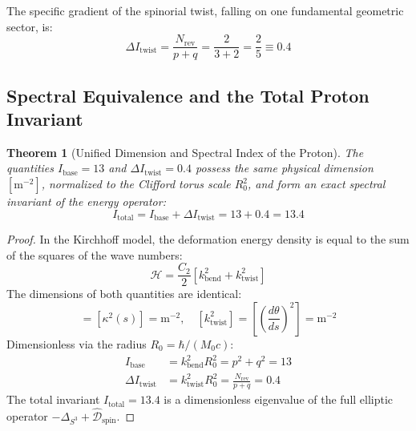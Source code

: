 \documentclass[12pt,a4paper]{article}
\newtheorem{theorem}{Theorem}
\begin{document}
	The specific gradient of the spinorial twist, falling on one fundamental geometric sector, is:
	\begin{equation}
		\Delta I_{\text{twist}} = \frac{N_{\text{rev}}}{p + q} = \frac{2}{3 + 2} = \frac{2}{5} \equiv \mathbf{0.4}
	\end{equation}
	
	\subsection{Spectral Equivalence and the Total Proton Invariant}
	\begin{theorem}[Unified Dimension and Spectral Index of the Proton]
		The quantities $I_{\mathrm{base}} = 13$ and $\Delta I_{\mathrm{twist}} = 0.4$ possess the same physical dimension $[\mathrm{m}^{-2}]$, normalized to the Clifford torus scale $R_0^2$, and form an exact spectral invariant of the energy operator:
		\begin{equation}
			I_{\mathrm{total}} = I_{\mathrm{base}} + \Delta I_{\mathrm{twist}} = 13 + 0.4 = \mathbf{13.4}
		\end{equation}
	\end{theorem}
	
	\begin{proof}
		In the Kirchhoff model, the deformation energy density is equal to the sum of the squares of the wave numbers:
		\begin{equation}
			\mathcal{H} = \frac{C_2}{2} \left[ k_{\text{bend}}^2 + k_{\text{twist}}^2 \right]
		\end{equation}
		The dimensions of both quantities are identical:
		\begin{equation}
			[k_{\text{bend}}^2] = [\kappa^2(s)] = \text{m}^{-2}, \quad [k_{\text{twist}}^2] = \left[\left(\frac{d\theta}{ds}\right)^2\right] = \text{m}^{-2}
		\end{equation}
		Dimensionless via the radius $R_0 = \hbar / (M_0 c)$:
		\begin{align}
			I_{\text{base}} &= k_{\text{bend}}^2 R_0^2 = p^2 + q^2 = 13 \\
			\Delta I_{\text{twist}} &= k_{\text{twist}}^2 R_0^2 = \frac{N_{\text{rev}}}{p+q} = 0.4
		\end{align}
		The total invariant $I_{\text{total}} = 13.4$ is a dimensionless eigenvalue of the full elliptic operator $-\Delta_{S^3} + \hat{\mathcal{D}}_{\text{spin}}$.
	\end{proof}
	
\end{document}
